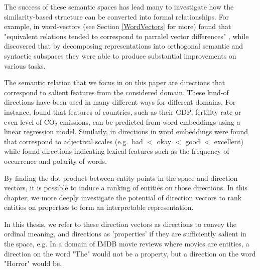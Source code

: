 The success of these semantic spaces has lead many to investigate how the similarity-based structure can be converted into formal relationships. For example, in word-vectors (see Section \ref{WordVectors} for more) \cite{TomasMikolovWen-tauYih2013} found that "equivalent relations tended to correspond to parralel vector differences" \cite{Mitchell2015}, while \cite{Mitchell2015} discovered that by decomposing representations into orthogonal semantic and syntactic subspaces they were able to produce substantial improvements on various tasks.  %

The semantic relation that we focus in on this paper are directions that correspond to salient features from the considered domain. These kind-of directions have been used in many different ways for different domains, For instance,  \cite{gupta2015distributional} found that features of countries, such as their GDP, fertility rate or even level of CO$_2$ emissions, can be predicted from word embeddings using a linear regression model. Similarly, in \cite{kim2013deriving} directions in word embeddings were found that correspond to adjectival scales (e.g.\ bad $<$ okay $<$ good $<$ excellent) while \cite{DBLP:conf/acl/RotheS16} found directions indicating lexical features such as the frequency of occurrence and polarity of words. 

By finding the dot product between entity points in the space and direction vectors, it is possible to induce a ranking of entities on those directions. In this chapter, we more deeply investigate the potential of direction vectors to rank entities on properties to form an interpretable representation. 

 In this thesis, we refer to these direction vectors as directions to convey the ordinal meaning, and directions as 'properties' if they are sufficiently salient in the space, e.g. In a domain of IMDB movie reviews where movies are entities, a direction on the word "The" would not be a property, but a direction on the word "Horror" would be. 

